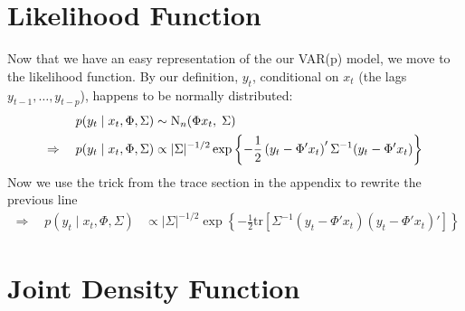 \documentclass[a4paper,12pt]{scrartcl}
\begin{document}
\section{Likelihood Function}

Now that we have an easy representation of the our
VAR(p) model, we move to the likelihood function.
By our definition,  $y_t$, conditional on $x_t$ 
(the lags $y_{t-1}, \ldots, y_{t-p}$), happens
to be normally distributed:
\begin{align}
    p(y_t \; | \; x_t, \Phi, \Sigma) &\sim
	\text{N}_{n}(\Phi x_t, \; \Sigma) \notag \\
    \Rightarrow \quad p(y_t \; | \; x_t, \Phi, \Sigma) 
	&\propto |\Sigma|^{-1/2} 
	\exp\left\{ -\frac{1}{2} \left(y_t - \Phi' x_t
	\right)' \Sigma^{-1} (y_t - \Phi' x_t)\right\}
\end{align}
Now we use the trick from the trace section in the 
appendix to rewrite the previous line
\begin{align}
    \Rightarrow \quad p(y_t \; | \; x_t, \Phi, \Sigma) 
	&\propto |\Sigma|^{-1/2} 
	\exp\left\{ -\frac{1}{2} \text{tr} \left[ \Sigma^{-1}  
	(y_t - \Phi' x_t)\left(y_t - \Phi' x_t\right)'
	\right]\right\}
\end{align}



\newpage
\section{Joint Density Function}
\end{document}
